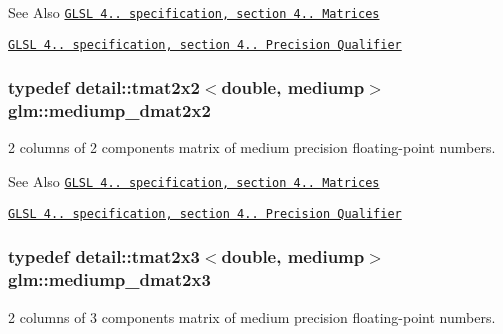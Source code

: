 \begin{DoxySeeAlso}{See Also}
\href{http://www.opengl.org/registry/doc/GLSLangSpec.4.20.8.pdf}{\tt G\-L\-S\-L 4.. specification, section 4.. Matrices} 

\href{http://www.opengl.org/registry/doc/GLSLangSpec.4.20.8.pdf}{\tt G\-L\-S\-L 4.. specification, section 4.. Precision Qualifier} 
\end{DoxySeeAlso}
\hypertarget{group__core__precision_ga88ddb4188060ab00fee67c9840f4417e}{
\subsubsection[{mediump\-\_\-dmat2x2}]{\setlength{\rightskip}{0pt plus 5cm}typedef detail\-::tmat2x2$<$double, mediump$>$ {\bf glm\-::mediump\-\_\-dmat2x2}}}\label{group__core__precision_ga88ddb4188060ab00fee67c9840f4417e}
2 columns of 2 components matrix of medium precision floating-\/point numbers.

\begin{DoxySeeAlso}{See Also}
\href{http://www.opengl.org/registry/doc/GLSLangSpec.4.20.8.pdf}{\tt G\-L\-S\-L 4.. specification, section 4.. Matrices} 

\href{http://www.opengl.org/registry/doc/GLSLangSpec.4.20.8.pdf}{\tt G\-L\-S\-L 4.. specification, section 4.. Precision Qualifier} 
\end{DoxySeeAlso}
\hypertarget{group__core__precision_ga734e988edf759c7012c443014acb6674}{
\subsubsection[{mediump\-\_\-dmat2x3}]{\setlength{\rightskip}{0pt plus 5cm}typedef detail\-::tmat2x3$<$double, mediump$>$ {\bf glm\-::mediump\-\_\-dmat2x3}}}\label{group__core__precision_ga734e988edf759c7012c443014acb6674}
2 columns of 3 components matrix of medium precision floating-\/point numbers.

